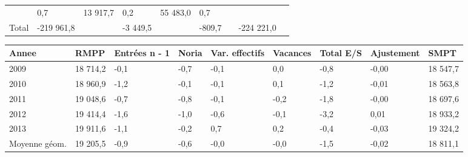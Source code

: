 \begin{longtable}[]{@{}lllllllll@{}}
\begin{minipage}[t]{0.16\columnwidth}
\end{minipage} & \begin{minipage}[t]{0.06\columnwidth}\raggedright
0,7\strut
\end{minipage} & \begin{minipage}[t]{0.12\columnwidth}\raggedright
13 917,7\strut
\end{minipage} & \begin{minipage}[t]{0.06\columnwidth}\raggedright
0,2\strut
\end{minipage} & \begin{minipage}[t]{0.09\columnwidth}\raggedright
55 483,0\strut
\end{minipage} & \begin{minipage}[t]{0.06\columnwidth}\raggedright
0,7\strut
\end{minipage}\tabularnewline
\begin{minipage}[t]{0.05\columnwidth}\raggedright
Total\strut
\end{minipage} & \begin{minipage}[t]{0.10\columnwidth}\raggedright
-219 961,8\strut
\end{minipage} & \begin{minipage}[t]{0.06\columnwidth}\raggedright
\strut
\end{minipage} & \begin{minipage}[t]{0.16\columnwidth}\raggedright
-3 449,5\strut
\end{minipage} & \begin{minipage}[t]{0.06\columnwidth}\raggedright
\strut
\end{minipage} & \begin{minipage}[t]{0.12\columnwidth}\raggedright
-809,7\strut
\end{minipage} & \begin{minipage}[t]{0.06\columnwidth}\raggedright
\strut
\end{minipage} & \begin{minipage}[t]{0.09\columnwidth}\raggedright
-224 221,0\strut
\end{minipage} & \begin{minipage}[t]{0.06\columnwidth}\raggedright
\strut
\end{minipage}\tabularnewline
\bottomrule
\end{longtable}

\begin{longtable}[]{@{}lllllllll@{}}
\toprule
Annee & RMPP & Entrées n - 1 & Noria & Var. effectifs & Vacances & Total
E/S & Ajustement & SMPT\tabularnewline
\midrule
\endhead
2009 & 18 714,2 & -0,1 & -0,7 & -0,1 & 0,0 & -0,8 & -0,00 & 18
547,7\tabularnewline
2010 & 18 960,9 & -1,2 & -0,1 & -0,1 & 0,1 & -1,2 & -0,01 & 18
563,8\tabularnewline
2011 & 19 048,6 & -0,7 & -0,8 & -0,1 & -0,2 & -1,8 & -0,00 & 18
697,6\tabularnewline
2012 & 19 414,4 & -1,6 & -1,0 & -0,6 & -0,1 & -3,2 & 0,01 & 18
933,2\tabularnewline
2013 & 19 911,6 & -1,1 & -0,2 & 0,7 & 0,2 & -0,4 & -0,03 & 19
324,2\tabularnewline
Moyenne géom. & 19 205,5 & -0,9 & -0,6 & -0,0 & -0,0 & -1,5 & -0,02 & 18
811,1\tabularnewline
\bottomrule
\end{longtable}

